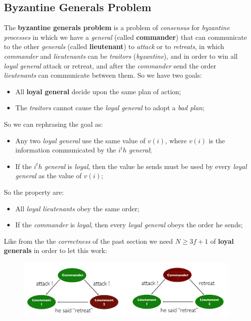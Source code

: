\documentclass{article}
\begin{document}
\subsection{Byzantine Generals Problem}
The \textbf{byzantine generals problem} is a problem of \emph{consensus} for \emph{byzantine processes} in which we have a \emph{general} (called \textbf{commander}) that can communicate to the other \emph{generals} (called \textbf{lieutenant}) to \emph{attack} or to \emph{retreats}, in which \emph{commander} and \emph{lieutenants} can be \emph{traitors} (\emph{byzantine}), and in order to win all \emph{loyal general} attack or retreat, and after the \emph{commander} send the order \emph{lieutenants} can communicate between them. So we have two goals:
\begin{itemize}
\item All \textbf{loyal general} decide upon the same plan of action;
\item The \emph{traitors} cannot cause the \emph{loyal general} to adopt a \emph{bad plan};
\end{itemize}
So we can rephrasing the goal as:
\begin{itemize}
\item Any two \emph{loyal general} use the same value of $v(i)$, where $v(i)$ is the information communicated by the $i^th$ \emph{general};
\item If the $i^th$ \emph{general} is \emph{loyal}, then the value he sends must be used by every \emph{loyal general} as the value of $v(i)$;
\end{itemize}
So the property are:
\begin{itemize}
\item All \emph{loyal lieutenants} obey the same order;
\item If the \emph{commander} is \emph{loyal}, then every \emph{loyal general} obeys the order he sends;
\end{itemize}
Like from the the \emph{correctness} of the past section we need $N\geq 3f +1$ of \textbf{loyal generals} in order to let this work:
\begin{figure}[H]
  \centering
  \includegraphics[scale=0.9]{cattura86.png}
\end{figure}
\end{document}
